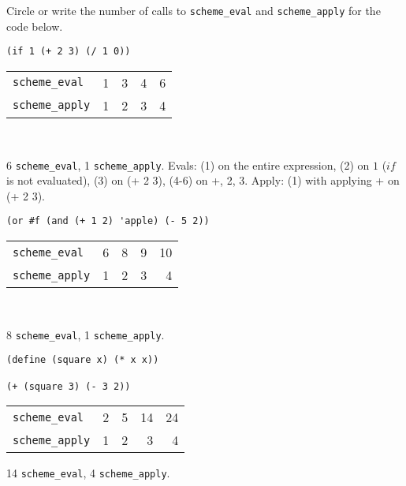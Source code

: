 \begin{blocksection}
\question Circle or write the number of calls to \lstinline$scheme_eval$ and
\lstinline$scheme_apply$ for the code below.

\begin{lstlisting}
(if 1 (+ 2 3) (/ 1 0))
\end{lstlisting}

\begin{tabular}{lrrrr}
\lstinline$scheme_eval$ & 1 & 3 & 4 & 6 \\
\lstinline$scheme_apply$ & 1 & 2 & 3 & 4
\end{tabular}
\\

\begin{solution}
6 \lstinline$scheme_eval$, 1 \lstinline$scheme_apply$.
Evals: (1) on the entire expression, (2) on \listinline$1$ (\stinline$if$ is not evaluated), (3) on (+ 2 3), (4-6) on +, 2, 3.
Apply: (1) with applying + on (+ 2 3).
\end{solution}

\vspace{2\baselineskip}
\begin{lstlisting}
(or #f (and (+ 1 2) 'apple) (- 5 2))
\end{lstlisting}

\begin{tabular}{lrrrr}
\lstinline$scheme_eval$ & 6 & 8 & 9 & 10 \\
\lstinline$scheme_apply$ & 1 & 2 & 3 & 4
\end{tabular}
\\

\begin{solution}
8 \lstinline$scheme_eval$, 1 \lstinline$scheme_apply$.
\end{solution}

\vspace{2\baselineskip}
\begin{lstlisting}
(define (square x) (* x x))

(+ (square 3) (- 3 2))
\end{lstlisting}

\begin{tabular}{lrrrr}
\lstinline$scheme_eval$ & 2 & 5 & 14 & 24 \\
\lstinline$scheme_apply$ & 1 & 2 & 3 & 4
\end{tabular}

\begin{solution}
14 \lstinline$scheme_eval$, 4 \lstinline$scheme_apply$.
\end{solution}


\end{blocksection}
